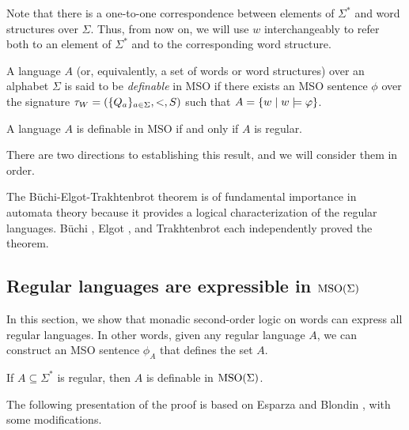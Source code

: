 \documentclass[11pt,twoside=off,numbers=noenddot]{scrbook}
\begin{document}
\begin{abuse}
  Note that there is a one-to-one correspondence between elements of $\Sigma^\ast$ and word structures over $\Sigma$. Thus, from now on, we will use $w$ interchangeably to refer both to an element of $\Sigma^\ast$ and to the corresponding word structure.
\end{abuse}

\begin{definition}
  A language $A$ (or, equivalently, a set of words or word structures) over an alphabet $\Sigma$ is said to be \emph{definable} in MSO if there exists an MSO sentence $\phi$ over the signature $\tau_W = (\{ Q_a \}_{a \in \Sigma}, <, S)$ such that $A = \{ w \mid w \models \varphi \}$.
\end{definition}

\begin{theorem}
  A language $A$ is definable in MSO if and only if $A$ is regular.
\end{theorem}

There are two directions to establishing this result, and we will consider them in order.

\begin{remark}
  The Büchi-Elgot-Trakhtenbrot theorem is of fundamental importance in automata theory because it provides a logical characterization of the regular languages. Büchi \cite{buchi1960weak}, Elgot \cite{elgot1961decision}, and Trakhtenbrot \cite{trakhtenbrot1962finite} each independently proved the theorem.
\end{remark}

\subsection{Regular languages are expressible in $\text{MSO}(\Sigma)$}
In this section, we show that monadic second-order logic on words can express all regular languages. In other words, given any regular language $A$, we can construct an MSO sentence $\phi_A$ that defines the set $A$.

\begin{lemma}
  If $A \subseteq \Sigma^\ast$ is regular, then $A$ is definable in $\text{MSO}(\Sigma)$.
\end{lemma}

The following presentation of the proof is based on Esparza and Blondin \cite{esparza2023automata}, with some modifications.
\end{document}
